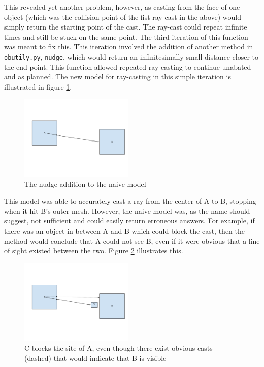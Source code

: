 This revealed yet another problem, however, as casting from the face of one object (which was the collision point of the fist ray-cast in the above) would simply return the starting point of the cast. The ray-cast could repeat infinite times and still be stuck on the same point. The third iteration of this function was meant to fix this. This iteration involved the addition of another method in \texttt{obutily.py}, \texttt{nudge}, which would return an infinitesimally small distance closer to the end point. This function allowed repeated ray-casting to continue unabated and as planned. The new model for ray-casting in this simple iteration is illustrated in figure \ref{fig:vision3}. 

\begin{figure}[h]
	\begin{center}
		\includegraphics[width=0.48\textwidth]{figures/vision3.png}
	\end{center}
	\caption{The nudge addition to the naive model}
	\label{fig:vision3}
\end{figure}

This model was able to accurately cast a ray from the center of A to B, stopping when it hit B's outer mesh. However, the naive model was, as the name should suggest, not sufficient and could easily return erroneous answers. For example, if there was an object in between A and B which could block the cast, then the method would conclude that A could not see B, even if it were obvious that a line of sight existed between the two. Figure \ref{fig:vision4} illustrates this.

\begin{figure}[h]
	\begin{center}
		\includegraphics[width=0.48\textwidth]{figures/vision4.png}
	\end{center}
	\caption{C blocks the site of A, even though there exist obvious casts (dashed) that would indicate that B is visible}
	\label{fig:vision4}
\end{figure}

